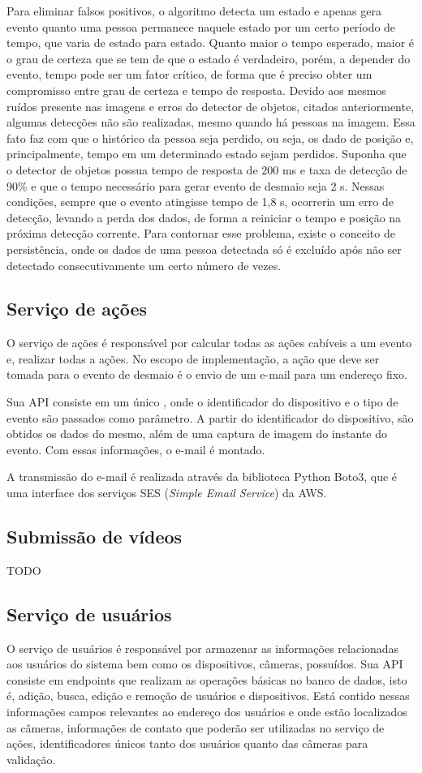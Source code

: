 \documentclass[]{politex}
\begin{document}
Para eliminar falsos positivos, o algoritmo detecta um estado e apenas gera evento quanto uma pessoa permanece naquele estado por um certo período de tempo, que varia de estado para estado. Quanto maior o tempo esperado, maior é o grau de certeza que se tem de que o estado é verdadeiro, porém, a depender do evento, tempo pode ser um fator crítico, de forma que é preciso obter um compromisso entre grau de certeza e tempo de resposta. Devido aos mesmos ruídos presente nas imagens e erros do detector de objetos, citados anteriormente, algumas detecções não são realizadas, mesmo quando há pessoas na imagem. Essa fato faz com que o histórico da pessoa seja perdido, ou seja, os dado de posição e, principalmente, tempo em um determinado estado sejam perdidos. Suponha que o detector de objetos possua tempo de resposta de 200 ms e taxa de detecção de 90\% e que o tempo necessário para gerar evento de desmaio seja 2 s. Nessas condições, sempre que o evento atingisse tempo de 1,8 s, ocorreria um erro de detecção, levando a perda dos dados, de forma a reiniciar o tempo e posição na próxima detecção corrente. Para contornar esse problema, existe o conceito de persistência, onde os dados de uma pessoa detectada só é excluído após não ser detectado consecutivamente um certo número de vezes.

\subsection{Serviço de ações}
O serviço de ações é responsável por calcular todas as ações cabíveis a um evento e, realizar todas a ações. No escopo de implementação, a ação que deve ser tomada para o evento de desmaio é o envio de um e-mail para um endereço fixo.

Sua API consiste em um único , onde o identificador do dispositivo e o tipo de evento são passados como parâmetro. A partir do identificador do dispositivo, são obtidos os dados do mesmo, além de uma captura de imagem do instante do evento. Com essas informações, o e-mail é montado.

A transmissão do e-mail é realizada através da biblioteca Python Boto3, que é uma interface dos serviços SES (\textit{Simple Email Service}) da AWS.

\subsection{Submissão de vídeos}
TODO

\subsection{Serviço de usuários}
O serviço de usuários é responsável por armazenar as informações relacionadas aos usuários do sistema bem como os dispositivos, câmeras, possuídos. Sua API consiste em endpoints que realizam as operações básicas no banco de dados, isto é, adição, busca, edição e remoção de usuários e dispositivos. Está contido nessas informações campos relevantes ao endereço dos usuários e onde estão localizados as câmeras, informações de contato que poderão ser utilizadas no serviço de ações, identificadores únicos tanto dos usuários quanto das câmeras para validação.
\end{document}
